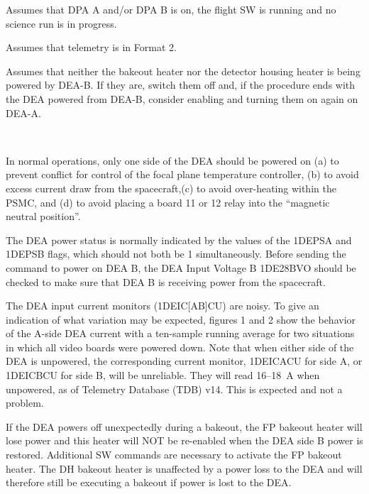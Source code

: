 \documentclass[11pt]{article}
\begin{document}
\vspace{0.15in}

\bi
\item Assumes that DPA A and/or DPA B is on, the flight SW is running and no 
science run is in progress.
\ei

\vspace{0.15in}

\bi
\item Assumes that telemetry is in Format 2.
\item Assumes that neither the bakeout heater nor the detector housing heater is
being powered by DEA-B. If they are, switch them off and, if the procedure ends
with the DEA powered from DEA-B, consider enabling and turning them on again
on DEA-A.
\ei

\normalsize
{} \\
\normalsize

In normal operations, only one side of the DEA should be powered on
(a) to prevent conflict for control of the focal plane temperature controller,
(b) to avoid excess current draw from the spacecraft,(c) to avoid over-heating
within the PSMC, and (d) to avoid placing a board 11 or 12 relay into the 
``magnetic neutral position''.

The DEA power status is normally indicated by the values of the 1DEPSA and
1DEPSB flags, which should not both be 1 simultaneously. Before sending the 
command to power on DEA B, the DEA Input Voltage B 1DE28BVO should 
be checked to make sure that DEA B is receiving power from the spacecraft.

The DEA input current monitors (1DEIC[AB]CU) are noisy.
To give an indication of what variation may be expected, figures 1 and 2
show the behavior of the A-side DEA current with a ten-sample running
average for two situations in which all video boards were powered down. Note that
when either side of the DEA is unpowered, the corresponding current monitor, 
1DEICACU for side A, or 1DEICBCU for side B, will be unreliable. They will read
16--18~A when unpowered, as of Telemetry Database (TDB) v14. This is expected and
not a problem.

If the DEA powers off unexpectedly during a bakeout, the FP bakeout 
heater will lose power and this heater will NOT be re-enabled when the DEA side B 
power is restored. Additional SW commands are necessary to activate the FP bakeout 
heater. The DH bakeout heater is unaffected by a power loss to the DEA and will 
therefore still be executing a bakeout if power is lost to the DEA.
\end{document}

